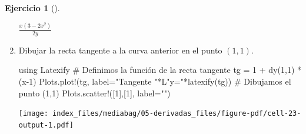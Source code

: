\documentclass[
  a4paper,
]{scrreport}
\newenvironment{Shaded}{\begin{snugshade}}{\end{snugshade}}
\newcommand{\BuiltInTok}[1]{\textcolor[rgb]{0.00,0.23,0.31}{#1}}
\newcommand{\CommentTok}[1]{\textcolor[rgb]{0.37,0.37,0.37}{#1}}
\newcommand{\FloatTok}[1]{\textcolor[rgb]{0.68,0.00,0.00}{#1}}
\newcommand{\FunctionTok}[1]{\textcolor[rgb]{0.28,0.35,0.67}{#1}}
\newcommand{\ImportTok}[1]{\textcolor[rgb]{0.00,0.46,0.62}{#1}}
\newcommand{\NormalTok}[1]{\textcolor[rgb]{0.00,0.23,0.31}{#1}}
\newcommand{\OperatorTok}[1]{\textcolor[rgb]{0.37,0.37,0.37}{#1}}
\newcommand{\StringTok}[1]{\textcolor[rgb]{0.13,0.47,0.30}{#1}}
\theoremstyle{definition}
\newtheorem{exercise}{Ejercicio}[chapter]
\theoremstyle{remark}
\begin{document}
\begin{exercise}[]
\begin{enumerate}
\begin{tcolorbox}
  $\frac{x \left(3 - 2 x^{2}\right)}{2 y}$

  \end{tcolorbox}
\item
  Dibujar la recta tangente a la curva anterior en el punto \((1,1)\).

  \begin{tcolorbox}[enhanced jigsaw, opacitybacktitle=0.6, bottomrule=.15mm, opacityback=0, colback=white, left=2mm, coltitle=black, rightrule=.15mm, breakable, bottomtitle=1mm, leftrule=.75mm, title=\textcolor{quarto-callout-tip-color}{\faLightbulb}\hspace{0.5em}{Solución}, titlerule=0mm, toptitle=1mm, colbacktitle=quarto-callout-tip-color!10!white, colframe=quarto-callout-tip-color-frame, toprule=.15mm, arc=.35mm]

\begin{Shaded}
\begin{Highlighting}[]
\ImportTok{using} \BuiltInTok{Latexify}
\CommentTok{\# Definimos la función de la recta tangente}
\NormalTok{tg }\OperatorTok{=} \FloatTok{1} \OperatorTok{+} \FunctionTok{dy}\NormalTok{(}\FloatTok{1}\NormalTok{,}\FloatTok{1}\NormalTok{) }\OperatorTok{*}\NormalTok{ (x}\OperatorTok{{-}}\FloatTok{1}\NormalTok{)}
\NormalTok{Plots.}\FunctionTok{plot!}\NormalTok{(tg, label}\OperatorTok{=}\StringTok{"Tangente "}\OperatorTok{*}\NormalTok{L}\StringTok{"y="}\FunctionTok{*latexify}\NormalTok{(tg))}
\CommentTok{\# Dibujamos el punto (1,1)}
\NormalTok{Plots.}\FunctionTok{scatter!}\NormalTok{([}\FloatTok{1}\NormalTok{],[}\FloatTok{1}\NormalTok{], label}\OperatorTok{=}\StringTok{""}\NormalTok{)}
\end{Highlighting}
\end{Shaded}

  \texttt{[image: index\_files/mediabag/05-derivadas\_files/figure-pdf/cell-23-output-1.pdf]}

  \end{tcolorbox}
\end{enumerate}

\end{exercise}
\end{document}

